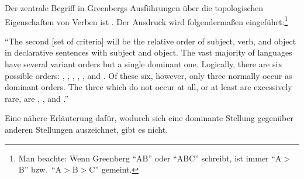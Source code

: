 \documentclass[output=paper]{langsci/langscibook}
\begin{document}
\ssubsection{}%
\label{subsec:1-2.1}
Der zentrale Begriff in Greenbergs Ausführungen über die topologischen Eigenschaften von Verben ist
. Der Ausdruck wird folgendermaßen eingeführt:\footnote{%
  Man beachte: Wenn Greenberg "`AB"' oder "`ABC"' schreibt, ist immer "`A$>$B"' bzw.\ "`A$>$B$>$C"' gemeint.%
}
\begin{exe}
\ex\label{ex:1-2-1}
\begin{xlist}
\ex\label{ex:1-2-1a} "`The second [set of criteria] will be the relative order of subject, verb, and
object in declarative sentences with  subject and object.
\ex\label{ex:1-2-1b} The vast majority of languages have several variant orders but a single dominant one.
\ex\label{ex:1-2-1c} Logically, there are six possible orders: , , , , , and
.
\ex\label{ex:1-2-1d} Of these six, however, only three normally occur as dominant orders.
\ex\label{ex:1-2-1e} The three which do not occur at all, or at least are excessively rare, are ,
, and ."' \citep[76]{Greenberg1963}
\end{xlist}
\end{exe}
Eine nähere Erläuterung dafür, wodurch sich eine dominante Stellung gegenüber anderen Stellungen auszeichnet, gibt es nicht.
\end{document}
